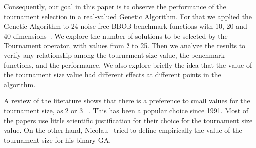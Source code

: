  Consequently, our goal in this paper is to observe the performance of the tournament selection in a real-valued Genetic Algorithm. For that we applied the Genetic Algorithm to 24 noise-free BBOB benchmark functions with 10, 20 and 40 dimensions~\cite{hansen2010real}. We explore the number of solutions to be selected by the Tournament operator, with values from 2 to 25. Then we analyze the results to verify any relationship among the tournament size value, the benchmark functions, and the performance. We also explore briefly the idea that the value of the tournament size value had different effects at different points in the algorithm.

 A review of the literature shows that there is a preference to small values for the tournament size, as 2 or 3 ~\cite{goldberg1991real, goldberg1993toward, agrawal1995simulated, harik1999gambler, tsutsui1999multi, harik1999compact, deb2000efficient, beyer2001self,kaelo2007integrated, bhunia2009application,  nicolau2009application, sawyerr2011comparative, sawyerr2015benchmarking}. This has been a popular choice since 1991. Most of the papers use little scientific justification for their choice for the tournament size value. On the other hand, Nicolau~\cite{nicolau2009application} tried to define empirically the value of the tournament size for his binary GA.
 
 